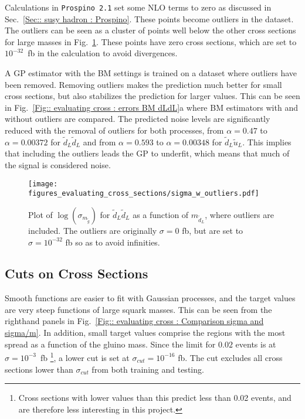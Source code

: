 \documentclass[twoside,english]{uiofysmaster}
\begin{document}
Calculations in \verb|Prospino 2.1| set some NLO terms to zero as discussed in Sec.~\ref{Sec:: susy hadron : Prospino}. These points become outliers in the dataset. The outliers can be seen as a cluster of points well below the other cross sections for large masses in Fig.~\ref{Fig:: evaluating cross : sigma w outliers}. These points have zero cross sections, which are set to $10^{-32}$~fb in the calculation to avoid divergences. 

A GP estimator with the BM settings is trained on a dataset where outliers have been removed. Removing outliers makes the prediction much better for small cross sections, but also stabilizes the prediction for larger values. This can be seen in Fig.~\ref{Fig:: evaluating cross : errors BM dLdL}a where BM estimators with and without outliers are compared. The predicted noise levels are significantly reduced with the removal of outliers for both processes, from $\alpha = 0.47$ to $\alpha = 0.00372$ for $\tilde{d}_L \tilde{d}_L$ and from $\alpha = 0.593$ to $\alpha= 0.00348$ for $\tilde{d}_L \tilde{u}_L$. This implies that including the outliers leads the GP to underfit, which means that much of the signal is considered noise.   


\begin{figure}
\centering
\texttt{[image: figures\_evaluating\_cross\_sections/sigma\_w\_outliers.pdf]}
\caption{Plot of $\log( \sigma_{m_{\tilde{g}}})$ for $\tilde{d}_L \tilde{d}_L$ as a function of $m_{\tilde{d}_L}$, where outliers are included. The outliers are originally $\sigma=0$ fb, but are set to $\sigma =10^{-32}$ fb so as to avoid infinities.}
\label{Fig:: evaluating cross : sigma w outliers}
\end{figure}

\subsection{Cuts on Cross Sections}

Smooth functions are easier to fit with Gaussian processes, and the target values are very steep functions of large squark masses. This can be seen from the righthand panels in Fig.~\ref{Fig:: evaluating cross : Comparison sigma and sigma/m}. In addition, small target values comprise the regions with the most spread as a function of the gluino mass. Since the limit for $0.02$ events is at $\sigma = 10^{-3}$~fb \footnote{Cross sections with lower values than this predict less than 0.02 events, and are therefore less interesting in this project.}, a lower cut is set at $\sigma_{cut} = 10^{-16}$ fb. The cut excludes all cross sections lower than $\sigma_{cut}$ from both training and testing. 
\end{document}
